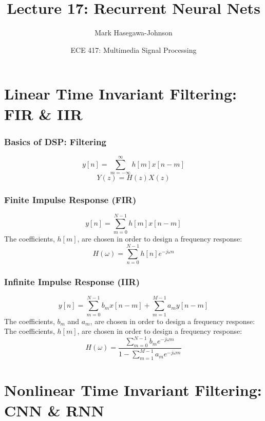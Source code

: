 \documentclass{beamer}
\title{Lecture 17: Recurrent Neural Nets}
\author{Mark Hasegawa-Johnson}
\date{ECE 417: Multimedia Signal Processing}
\begin{document}
\begin{frame}
  \maketitle
\end{frame}

\begin{frame}
  \tableofcontents
\end{frame}

\section[FIR/IIR]{Linear Time Invariant Filtering: FIR \& IIR}
\setcounter{subsection}{1}

\begin{frame}
  \frametitle{Basics of DSP: Filtering}
  \[
  y[n] = \sum_{m=-\infty}^\infty h[m] x[n-m]
  \]
  \[
  Y(z)=H(z)X(z)
  \]
\end{frame}

\begin{frame}
  \frametitle{Finite Impulse Response (FIR)}
  \[
  y[n] = \sum_{m=0}^{N-1}h[m]x[n-m]
  \]
  The coefficients, $h[m]$, are chosen in order to design a frequency response:
  \begin{displaymath}
    H(\omega)=\sum_{n=0}^{N-1} h[n]e^{-j\omega n}
  \end{displaymath}
\end{frame}

\begin{frame}
  \frametitle{Infinite Impulse Response (IIR)}
  \[
  y[n] = \sum_{m=0}^{N-1}b_mx[n-m] + \sum_{m=1}^{M-1}a_m y[n-m]
  \]
  The coefficients, $b_m$ and $a_m$, are chosen in order to design
  a frequency response:
  The coefficients, $h[m]$, are chosen in order to design a frequency response:
  \begin{displaymath}
    H(\omega)=\frac{\sum_{m=0}^{N-1} b_me^{-j\omega m}}{1-\sum_{m=1}^{M-1}a_me^{-j\omega m}}
  \end{displaymath}
\end{frame}

\section[CNN/RNN]{Nonlinear Time Invariant Filtering: CNN \& RNN}
\setcounter{subsection}{1}
\end{document}
